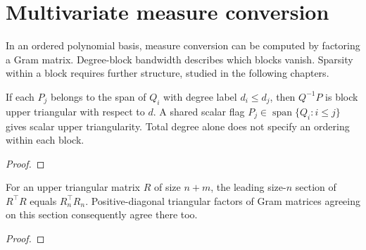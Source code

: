 \chapter{Multivariate measure conversion}\label{chap:multivariate-modification}
In an ordered polynomial basis, measure conversion can be computed by factoring
a Gram matrix. Degree-block bandwidth describes which blocks vanish. Sparsity
within a block requires further structure, studied in the following chapters.

\begin{supporting}
\begin{theorem}
\label{thm:conversion-flags}
\leanok
If each $P_j$ belongs to the span of $Q_i$ with degree label $d_i\le d_j$, then
$Q^{-1}P$ is block upper triangular with respect to $d$. A shared scalar flag
$P_j\in\operatorname{span}\{Q_i:i\le j\}$ gives scalar upper triangularity.
Total degree alone does not specify an ordering within each block.
\end{theorem}
\begin{proof}
\leanok
\end{proof}

\begin{theorem}
\label{thm:gram-factor-sections}
\leanok
For an upper triangular matrix $R$ of size $n+m$, the leading size-$n$ section
of $R^\top R$ equals $R_n^\top R_n$. Positive-diagonal triangular factors of
Gram matrices agreeing on this section consequently agree there too.
\end{theorem}
\begin{proof}
\leanok
\end{proof}
\end{supporting}


